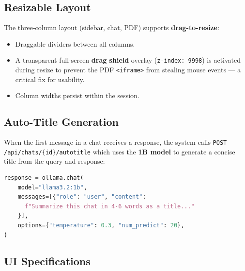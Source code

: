 \documentclass[12pt, a4paper]{article}
\begin{document}
\subsection{Resizable Layout}

The three-column layout (sidebar, chat, PDF) supports \textbf{drag-to-resize}:
\begin{itemize}[itemsep=2pt]
  \item Draggable dividers between all columns.
  \item A transparent full-screen \textbf{drag shield} overlay (\texttt{z-index: 9998}) is activated during resize to prevent the PDF \texttt{<iframe>} from stealing mouse events — a critical fix for usability.
  \item Column widths persist within the session.
\end{itemize}

\subsection{Auto-Title Generation}

When the first message in a chat receives a response, the system calls \texttt{POST /api/chats/\{id\}/autotitle} which uses the \textbf{1B model} to generate a concise title from the query and response:

\begin{lstlisting}[language=Python, caption={Auto-title generation via Ollama}]
response = ollama.chat(
    model="llama3.2:1b",
    messages=[{"role": "user", "content":
      f"Summarize this chat in 4-6 words as a title..."
    }],
    options={"temperature": 0.3, "num_predict": 20},
)
\end{lstlisting}

\subsection{UI Specifications}
\end{document}
